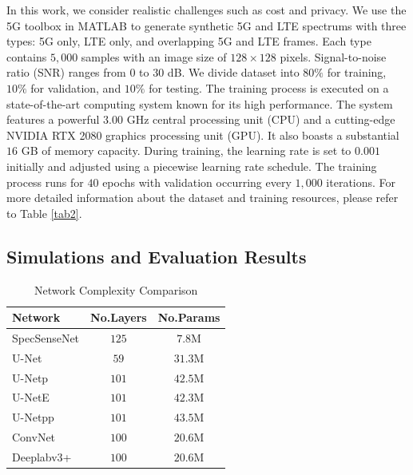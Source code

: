 \documentclass[conference]{IEEEtran} %
\begin{document}
In this work, we consider realistic challenges such as cost and privacy. We use the 5G toolbox in MATLAB to generate synthetic 5G and LTE spectrums with three types: 5G only, LTE only, and overlapping 5G and LTE frames. Each type contains $5,000$ samples with an image size of $128\times128$ pixels. Signal-to-noise ratio (SNR) ranges from $0$ to $30$ dB. We divide dataset into $80\%$ for training, $10\%$ for validation, and $10\%$ for testing.
The training process is executed on a state-of-the-art computing system known for its high performance. The system features a powerful $3.00$ GHz central processing unit (CPU) and a cutting-edge NVIDIA RTX 2080 graphics processing unit (GPU). It also boasts a substantial $16$ GB of memory capacity.
During training, the learning rate is set to $0.001$ initially and adjusted using a piecewise learning rate schedule. The training process runs for $40$ epochs with validation occurring every $1,000$ iterations.
For more detailed information about the dataset and training resources, please refer to Table \ref{tab2}.


\subsection{Simulations and Evaluation Results}

\begin{table}[!t]
\centering
\setlength{\tabcolsep}{8pt}
\caption{Network Complexity Comparison}
\label{tab1}
\begin{tabular}{l|c|c}
\hline
\textbf{Network} & \textbf{No.Layers} & \textbf{No.Params} \\
\hline
SpecSenseNet & $125$ & $7.8$M \\
U-Net \cite{ronneberger2015u} & $59$ & $31.3$M \\
U-Netp \cite{zhou2019unet++} & $101$ & $42.5$M  \\
U-NetE \cite{zhou2019unet++} & $101$ & $42.3$M \\
U-Netpp  \cite{zhou2019unet++} & $101$ & $43.5$M  \\
ConvNet  \cite{huynhthe2023intelligence} & $100$ & $20.6$M \\
Deeplabv3+ \cite{nguyen2023accurate} & $100$ & $20.6$M  \\
\hline
\end{tabular}
\end{table}
\end{document}

